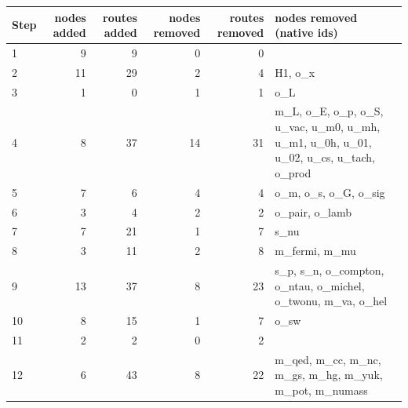 \begin{tabular}{@{}lrrrrp{6.2cm}@{}}\toprule
Step & nodes added & routes added & nodes removed & routes removed & nodes removed (native ids) \\\midrule
1 & 9 & 9 & 0 & 0 &  \\
2 & 11 & 29 & 2 & 4 & H1, o\_x \\
3 & 1 & 0 & 1 & 1 & o\_L \\
4 & 8 & 37 & 14 & 31 & m\_L, o\_E, o\_p, o\_S, u\_vac, u\_m0, u\_mh, u\_m1, u\_0h, u\_01, u\_02, u\_cs, u\_tach, o\_prod \\
5 & 7 & 6 & 4 & 4 & o\_m, o\_s, o\_G, o\_sig \\
6 & 3 & 4 & 2 & 2 & o\_pair, o\_lamb \\
7 & 7 & 21 & 1 & 7 & s\_nu \\
8 & 3 & 11 & 2 & 8 & m\_fermi, m\_mu \\
9 & 13 & 37 & 8 & 23 & s\_p, s\_n, o\_compton, o\_ntau, o\_michel, o\_twonu, m\_va, o\_hel \\
10 & 8 & 15 & 1 & 7 & o\_sw \\
11 & 2 & 2 & 0 & 2 &  \\
12 & 6 & 43 & 8 & 22 & m\_qed, m\_cc, m\_nc, m\_gs, m\_hg, m\_yuk, m\_pot, m\_numass \\
\bottomrule\end{tabular}
